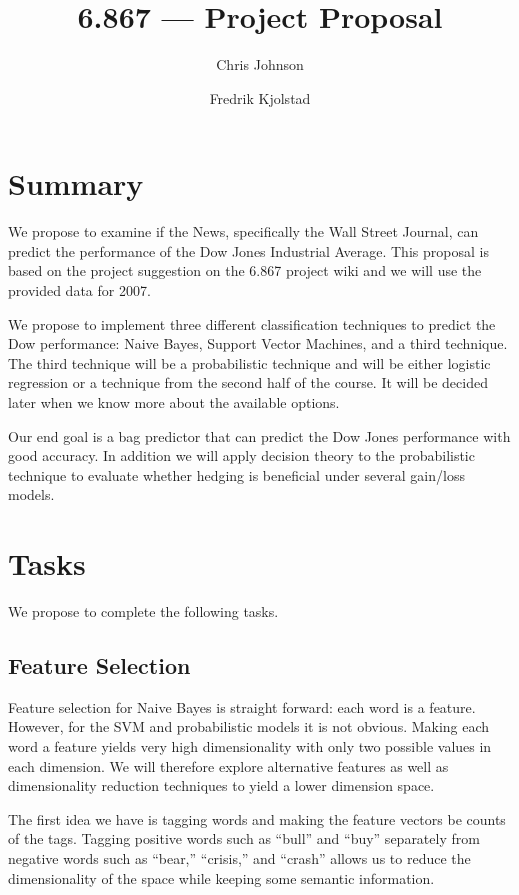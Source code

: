 \documentclass[10pt]{article}
\begin{document}
\title{6.867 --- Project Proposal}
\author{Chris Johnson \and Fredrik Kjolstad}
\date{}
\maketitle

\section{Summary}
We propose to examine if the News, specifically the Wall Street Journal, can predict the performance of the Dow Jones Industrial Average.
This proposal is based on the project suggestion on the 6.867 project wiki and we will use the provided data for 2007.

We propose to implement three different classification techniques to predict the Dow performance: Naive Bayes, Support Vector Machines, and a third technique. The third technique will be a probabilistic technique and will be either logistic regression or a technique from the second half of the course.
It will be decided later when we know more about the available options.

Our end goal is a bag predictor that can predict the Dow Jones performance with good accuracy.
In addition we will apply decision theory to the probabilistic technique to evaluate whether hedging is beneficial under several gain/loss models.

\section{Tasks}
We propose to complete the following tasks.
\subsection{Feature Selection}
Feature selection for Naive Bayes is straight forward: each word is a feature.
However, for the SVM and probabilistic models it is not obvious.
Making each word a feature yields very high dimensionality with only two possible values in each dimension.
We will therefore explore alternative features as well as dimensionality reduction techniques to yield a lower dimension space.

The first idea we have is tagging words and making the feature vectors be counts of the tags. 
Tagging positive words such as ``bull'' and ``buy'' separately from negative words such as ``bear,'' ``crisis,'' and ``crash'' allows us to reduce the dimensionality of the space while keeping some semantic information.
\end{document}
